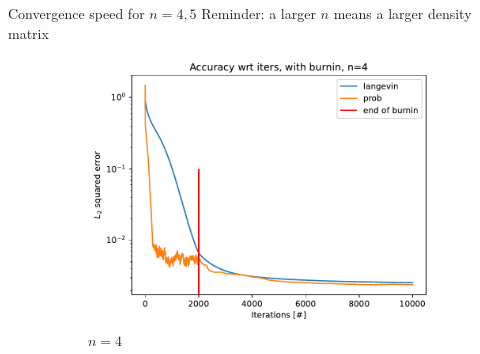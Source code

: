 \documentclass{beamer}
\begin{document}
\begin{frame}{Convergence speed for $n=4,5$}
    Reminder: a larger $n$ means a larger density matrix
    \begin{figure}[ht]

        \centering
    
    
    
    
    
        
        
        \begin{subfigure}[b]{0.49\textwidth}
    
    
            \centering
    
            \includegraphics[width=\textwidth]{figures/experiments/baseline/diff_n_qubits/iters_acc_comp_iters_no_avg_n4-1.png}
    
            \caption{$n=4$}
        
        \end{subfigure}
        \hfill
        \begin{subfigure}[b]{0.49\textwidth}
    

\end{subfigure}
\end{figure}
\end{frame}
\end{document}
